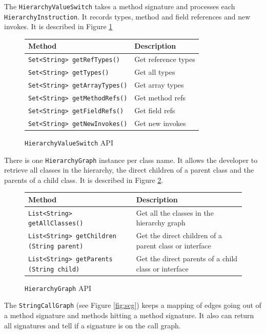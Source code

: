\documentclass{sigplanconf}
\begin{document}
The {\tt HierarchyValueSwitch} takes a method signature and processes each {\tt HierarchyInstruction}. It records types, method and field references and new invokes. It is described in Figure \ref{fig:hvsw}

\begin{figure}[htbf]
\begin{tabularx}{\columnwidth}{|lX|}
\hline
{\bf Method} & {\bf Description }\\\hline
{\tt Set<String> getRefTypes()} &  Get reference types\\\hline
{\tt Set<String> getTypes()} &  Get all types\\\hline
{\tt Set<String> getArrayTypes()} &  Get array types\\\hline
{\tt Set<String> getMethodRefs()} &  Get method refs\\\hline
{\tt Set<String> getFieldRefs()} &  Get field refs\\\hline
{\tt Set<String> getNewInvokes()} &  Get new invokes\\\hline
\end{tabularx}
\caption{{\tt HierarchyValueSwitch} API}
\label{fig:hvsw}
\end{figure}

There is one {\tt HierarchyGraph} instance per class name. It allows the developer to retrieve all classes in the hierarchy, the direct children of a parent class and the parents of a child class. It is described in Figure \ref{fig:hg}.

\begin{figure}[htbf]
\begin{tabularx}{\columnwidth}{|XX|}
\hline
{\bf Method} & {\bf Description }\\\hline
{\tt List<String> getAllClasses()} &  Get all the classes in the 
    hierarchy graph\\\hline
{\tt List<String> getChildren (String parent)} &  Get the direct 
    children of a parent class or interface\\\hline
{\tt List<String> getParents (String child)} &  Get the direct
    parents of a child class or interface\\\hline
\end{tabularx}
\caption{{\tt HierarchyGraph} API}
\label{fig:hg}
\end{figure}

The {\tt StringCallGraph} (see Figure \ref{fig:scg}) keeps a mapping of edges going out of a method signature and methods hitting a method signature. It also can return all signatures and tell if a signature is on the call graph.
\end{document}
